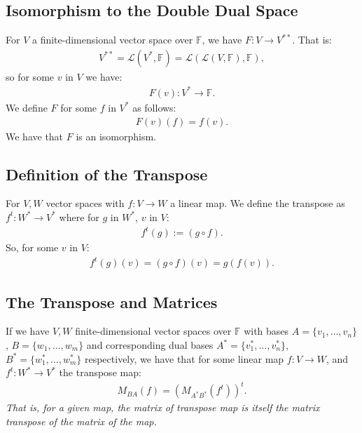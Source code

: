 \documentclass[a4paper, 12pt, twoside]{article}
\begin{document}
\subsection{Isomorphism to the Double Dual Space}

For $V$ a finite-dimensional vector space over $\mathbb{F}$, 
we have $F: V \to V^{**}$. That is: \begin{gather*}
  V^{**} = \mathcal{L}(V^*, \mathbb{F}) = \mathcal{L}(\mathcal{L}(V, \mathbb{F}), \mathbb{F}),
\end{gather*} so for some $v$ in $V$ we have: 
\begin{gather*}
  F(v) : V^* \to \mathbb{F}.
\end{gather*} We define $F$ for some $f$ in $V^*$ as follows: 
\begin{gather*}
  F(v)(f) = f(v).
\end{gather*} We have that $F$ is an isomorphism.

\subsection{Definition of the Transpose}

For $V, W$ vector spaces with $f : V \to W$ a linear map. We define
the transpose as $f^t : W^* \to V^*$ where for $g$ in $W^*$, $v$ in
$V$: \begin{gather*}
  f^t(g) := (g \circ f).
\end{gather*} So, for some $v$ in $V$: \begin{gather*}
  f^t(g)(v) = (g \circ f)(v) = g(f(v)).
\end{gather*}

\subsection{The Transpose and Matrices}

If we have $V, W$ finite-dimensional vector spaces over $\mathbb{F}$ with bases 
$A = \{v_1, \ldots, v_n\}$, $B = \{w_1, \ldots, w_m\}$ and corresponding
dual bases $A^* = \{v_1^*, \ldots, v_n^*\}$, $B^* = \{w_1^*, \ldots, w_m^*\}$
respectively, we have that for some linear map $f : V \to W$, and
$f^t : W^* \to V^*$ the transpose map: \begin{gather*}
  M_{BA}(f) = \left( M_{A^*B^*}(f^t) \right)^t.
\end{gather*} \textit{That is, for a given map, the matrix of 
transpose map is itself the matrix transpose of the matrix of the map.}
\end{document}
